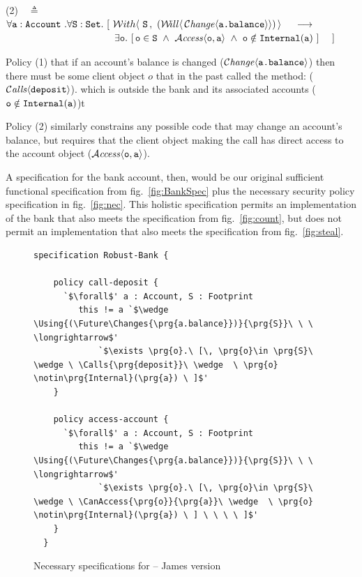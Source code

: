 \vspace{.1cm}

    (2)\ \  $\triangleq$\ \ $\forall \prg{a}:\prg{Account}\ .\forall \prg{S}:\prg{Set}.\ [  \ \Using{(\Future{\,\Changes{\prg{a.balance}}})\,}{\prg{S}\,}\ \ \   \
    \longrightarrow$ \\
 $\strut \hspace{3.9cm} \hfill \exists \prg{o}.\ [\, \prg{o}\in \prg{S}\ \wedge \ \CanAccess{\prg{o}}{\prg{a}}\ \wedge  \ \prg{o} \notin\prg{Internal}(\prg{a}) \ ] \ \ \ \ ]$


Policy (1) %
that if   an account's balance is changed
($\mathcal{C}\textrm{\textit{hange}}\langle{\mbox{\tt{a.balance}}}\rangle$)
then there must be some client object $o$ 
that in the past called the  method: (${\mathcal{C}}\textrm{\textit{alls}}\langle {\mbox{\tt{deposit}}}\rangle$).
which is outside the
bank and its associated accounts (${\mbox{\tt{o}}} \notin{\mbox{\tt{Internal}}}({\mbox{\tt{a}}})$)t

Policy (2) similarly constrains any possible code that may change an
account's balance, but requires that the client object making the call
has direct access to the account object
(${\mathcal{A}}\textrm{\textit{ccess}}\langle {\mbox{\tt{o}}},{\mbox{\tt{a}}}\rangle$).

A  specification for the bank account, then,
would be our original sufficient functional specification from
fig.~\ref{fig:BankSpec} plus the necessary security policy
specification in fig.~\ref{fig:nec}.  This holistic specification
permits an implementation of the bank that also meets the 
specification from fig.~\ref{fig:count}, but does not permit an
implementation that also meets the  specification from
fig.~\ref{fig:steal}.




\begin{figure}[tbp]
\begin{lstlisting}[escapeinside=`']
  specification Robust-Bank {

    policy call-deposit {
      `$\forall$' a : Account, S : Footprint
         this != a `$\wedge \Using{(\Future\Changes{\prg{a.balance}})}{\prg{S}}\ \ \ \longrightarrow$'
             `$\exists \prg{o}.\ [\, \prg{o}\in \prg{S}\ \wedge \ \Calls{\prg{deposit}}\ \wedge  \ \prg{o} \notin\prg{Internal}(\prg{a}) \ ]$'  
    }

    policy access-account {
      `$\forall$' a : Account, S : Footprint
         this != a `$\wedge \Using{(\Future\Changes{\prg{a.balance}})}{\prg{S}}\ \ \ \longrightarrow$'
             `$\exists \prg{o}.\ [\, \prg{o}\in \prg{S}\ \wedge \ \CanAccess{\prg{o}}{\prg{a}}\ \wedge  \ \prg{o} \notin\prg{Internal}(\prg{a}) \ ] \ \ \ \ ]$'
    }
  }
\end{lstlisting}
\caption{Necessary specifications for  -- James version}
\label{fig:kjx}
\end{figure}




